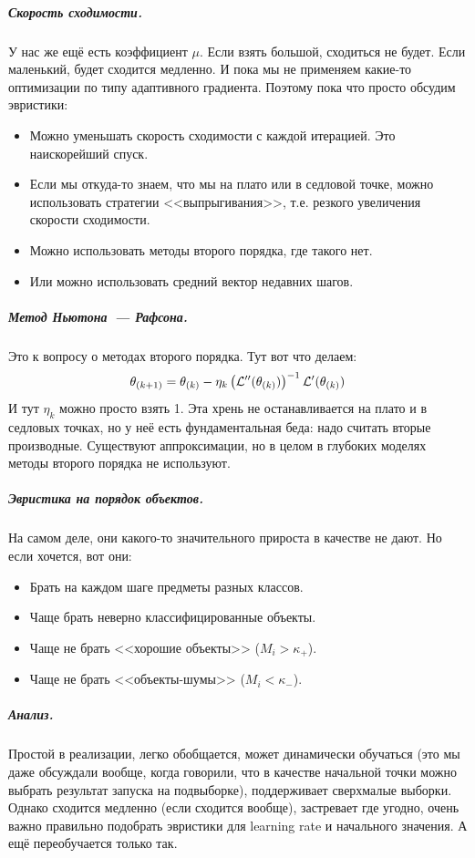 \documentclass{article}
\begin{document}
    \subparagraph{Скорость сходимости.}
    У нас же ещё есть коэффициент $\mu$. Если взять большой, сходиться не будет. Если маленький, будет сходится медленно. И пока мы не применяем какие-то оптимизации по типу адаптивного градиента. Поэтому пока что просто обсудим эвристики:
    \begin{itemize}
        \item Можно уменьшать скорость сходимости с каждой итерацией. Это наискорейший спуск.
        \item Если мы откуда-то знаем, что мы на плато или в седловой точке, можно использовать стратегии <<выпрыгивания>>, т.е. резкого увеличения скорости сходимости.
        \item Можно использовать методы второго порядка, где такого нет.
        \item Или можно использовать средний вектор недавних шагов.
    \end{itemize}
    \subparagraph{Метод Ньютона~--- Рафсона.}
    Это к вопросу о методах второго порядка. Тут вот что делаем:
    \[
    \theta_{(k+1)}=\theta_{(k)}-\eta_k\left({\mathcal{L}}''(\theta_{(k)})\right)^{-1}{\mathcal{L}}'(\theta_{(k)})
    \]
    И тут $\eta_k$ можно просто взять 1. Эта хрень не останавливается на плато и в седловых точках, но у неё есть фундаментальная беда: надо считать вторые производные. Существуют аппроксимации, но в целом в глубоких моделях методы второго порядка не используют.
    \subparagraph{Эвристика на порядок объектов.}
    На самом деле, они какого-то значительного прироста в качестве не дают. Но если хочется, вот они:
    \begin{itemize}
        \item Брать на каждом шаге предметы разных классов.
        \item Чаще брать неверно классифицированные объекты.
        \item Чаще не брать <<хорошие объекты>> ($M_i>\kappa_+$).
        \item Чаще не брать <<объекты-шумы>> ($M_i<\kappa_-$).
    \end{itemize}
    \subparagraph{Анализ.}
    Простой в реализации, легко обобщается, может динамически обучаться (это мы даже обсуждали вообще, когда говорили, что в качестве начальной точки можно выбрать результат запуска на подвыборке), поддерживает сверхмалые выборки. Однако сходится медленно (если сходится вообще), застревает где угодно, очень важно правильно подобрать эвристики для learning rate и начального значения. А ещё переобучается только так.
\end{document}

